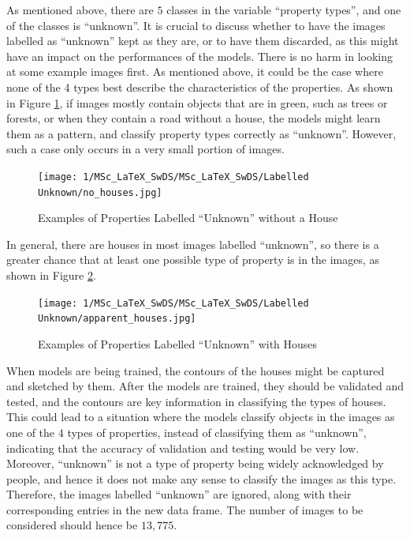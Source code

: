 \documentclass[11pt,twoside]{article}
\numberwithin{Theorem}{section}
\numberwithin{Definition}{section}
\numberwithin{Lemma}{section}
\numberwithin{Algorithm}{section}
\numberwithin{equation}{section}
\begin{document}
As mentioned above, there are $5$ classes in the variable “property types”, and one of the classes is “unknown”. It is crucial to discuss whether to have the images labelled as “unknown” kept as they are, or to have them discarded, as this might have an impact on the performances of the models. There is no harm in looking at some example images first. As mentioned above, it could be the case where none of the 4 types best describe the characteristics of the properties. As shown in Figure \ref{fig:unknown_green_road}, if images mostly contain objects that are in green, such as trees or forests, or when they contain a road without a house, the models might learn them as a pattern, and classify property types correctly as “unknown”. However, such a case only occurs in a very small portion of images. 

\begin{figure}[h]
\centering
\texttt{[image: 1/MSc\_LaTeX\_SwDS/MSc\_LaTeX\_SwDS/Labelled Unknown/no\_houses.jpg]}
\caption{Examples of Properties Labelled “Unknown” without a House}
\label{fig:unknown_green_road}
\end{figure}

In general, there are houses in most images labelled “unknown”, so there is a greater chance that at least one possible type of property is in the images, as shown in Figure \ref{fig:unknown_houses}. 

\begin{figure}[h]
\centering
\texttt{[image: 1/MSc\_LaTeX\_SwDS/MSc\_LaTeX\_SwDS/Labelled Unknown/apparent\_houses.jpg]}
\caption{Examples of Properties Labelled “Unknown” with Houses}
\label{fig:unknown_houses}
\end{figure}

When models are being trained, the contours of the houses might be captured and sketched by them. After the models are trained, they should be validated and tested, and the contours are key information in classifying the types of houses. This could lead to a situation where the models classify objects in the images as one of the $4$ types of properties, instead of classifying them as “unknown”, indicating that the accuracy of validation and testing would be very low. Moreover, “unknown” is not a type of property being widely acknowledged by people, and hence it does not make any sense to classify the images as this type. Therefore, the images labelled “unknown” are ignored, along with their corresponding entries in the new data frame. The number of images to be considered should hence be $13,775$.
\end{document}
